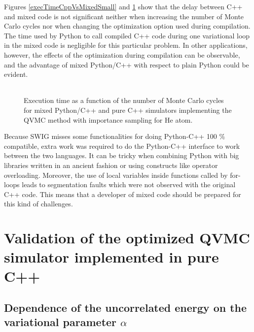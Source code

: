 \noindent
Figures \ref{execTimeCppVsMixedSmall} and \ref{execTimeCppVsMixedBig} show that the delay between C++ and mixed code is not significant neither when increasing the number of Monte Carlo cycles nor when changing the optimization option used during compilation. The time used by Python to call compiled C++ code during one variational loop in the mixed code is negligible for this particular problem. In other applications, however, the effects of the optimization during compilation can be observable, and the advantage of mixed Python/C++ with respect to plain Python could be evident.\\
\\
\begin{figure}
\centering
\scalebox{0.75}{}
\caption{Execution time as a function of the number of Monte Carlo cycles for mixed Python/C++ and pure C++ simulators implementing the QVMC method with importance sampling for He atom.}
\label{execTimeCppVsMixedBig}
\end{figure}

\noindent
Because SWIG misses some functionalities for doing Python-C++ 100 \% compatible, extra work was required to do the Python-C++ interface to work between the two languages. It can be tricky when combining Python with big libraries written in an ancient fashion or using constructs like operator overloading\cite{LangtangenMardal2003}. Moreover, the use of local variables inside functions called by for-loops leads to segmentation faults which were not observed with the original C++ code. This means that a developer of mixed code should be prepared for this kind of challenges.





\section{Validation of the optimized QVMC simulator implemented in pure C++}

\subsection{Dependence of the uncorrelated energy on the variational parameter $\alpha$}

